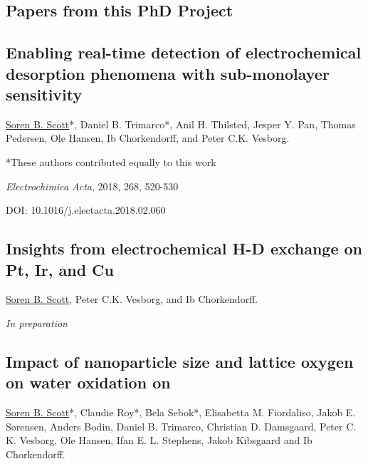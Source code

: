 
\begin{appendices}
	\chapter{Papers from this PhD Project}
		
		\renewcommand{\thesection}{\Roman{section}}
		\titleformat{\section}{\normalfont\Large\bfseries}{Paper~\thesection}{1em}{}	
		
		\section{Enabling real-time detection of electrochemical desorption phenomena with sub-monolayer sensitivity}\label{Trimarco2018}
		
		\underline{Soren B. Scott}*, Daniel B. Trimarco*, Anil H. Thilsted, Jesper Y. Pan, Thomas Pedersen, Ole Hansen, Ib Chorkendorff, and Peter C.K. Vesborg. 
		
		*These authors contributed equally to this work
		
		\textit{Electrochimica Acta}, 2018, 268, 520-530
		
		DOI: 10.1016/j.electacta.2018.02.060
		
		
		
		
		
		\clearpage
		\section[In Preparation: Insights from electrochemical H-D exchange on Pt, Ir, and Cu]{Insights from electrochemical H-D exchange on Pt, Ir, and Cu}\label{Scott2019_HD}
				
		\underline{Soren B. Scott}, Peter C.K. Vesborg, and Ib Chorkendorff. 
		
		\textit{In preparation}
		
		
		\clearpage
		\section{Impact of nanoparticle size and lattice oxygen on water oxidation on }\label{Roy2018}
		
		\underline{Soren B. Scott}*, Claudie Roy*, Bela Sebok*, Elisabetta M. Fiordaliso, Jakob E. Sørensen, Anders Bodin, Daniel B. Trimarco, Christian D. Damsgaard, Peter C. K. Vesborg, Ole Hansen, Ifan E. L. Stephens, Jakob Kibsgaard and Ib Chorkendorff. 
		

\end{appendices}

